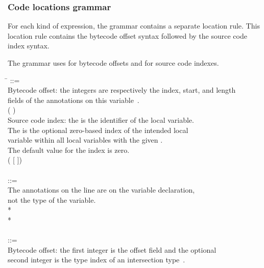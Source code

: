 \documentclass{article}
\begin{document}
\subsubsection{Code locations grammar\label{code-grammar}}

For each kind of expression, the grammar contains a separate location rule.
This location rule contains the bytecode offset syntax followed by the
source code index syntax.

The grammar uses \bnflit{\#} for bytecode offsets and \bnflit{*} for source code indexes.

\begin{tabbing}
\qquad \= \kill
{} ::= \\
\qquad    \bnfcmt Bytecode offset: the integers are respectively the index, start, and length \\
\qquad    \bnfcmt fields of the annotations on this variable~\cite{JSR308-webpage-201310}. \\
\qquad    ( \bnflit{\#}  \bnflit{+} ) \\
\qquad    \bnfcmt Source code index: the  is the identifier of the local variable. \\
\qquad    \bnfcmt The  is the optional zero-based index of the intended local \\
\qquad    \bnfcmt variable within all local variables with the given . \\
\qquad    \bnfcmt The default value for the index is zero. \\
\qquad    \bnfor{} ( [\bnflit{*} ]) \\
\\
 ::= \\
\qquad    \bnfcmt The annotations on the  line are on the variable declaration, \\
\qquad    \bnfcmt not the type of the variable. \\
\qquad    {}  \bnflit{:} * \lineend \\
\qquad    {}* \\
\\
 ::= \\
\qquad    \bnfcmt Bytecode offset: the first integer is the offset field and the optional \\
\qquad    \bnfcmt second integer is the type index of an intersection type~\cite{JSR308-webpage-201310}. \\

\end{tabbing}
\end{document}

